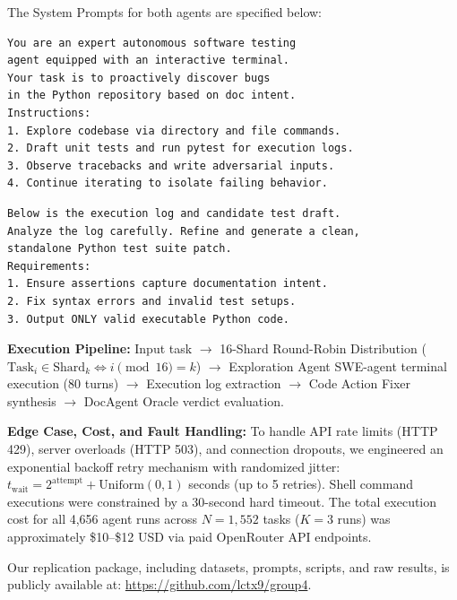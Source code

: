 The System Prompts for both agents are specified below:

\begin{lstlisting}[caption={System Prompt for Exploration Agent}, label={lst:prompt_explore}]
You are an expert autonomous software testing
agent equipped with an interactive terminal.
Your task is to proactively discover bugs
in the Python repository based on doc intent.
Instructions:
1. Explore codebase via directory and file commands.
2. Draft unit tests and run pytest for execution logs.
3. Observe tracebacks and write adversarial inputs.
4. Continue iterating to isolate failing behavior.
\end{lstlisting}

\begin{lstlisting}[caption={System Prompt for Code Action Fixer Agent}, label={lst:prompt_fixer}]
Below is the execution log and candidate test draft.
Analyze the log carefully. Refine and generate a clean,
standalone Python test suite patch.
Requirements:
1. Ensure assertions capture documentation intent.
2. Fix syntax errors and invalid test setups.
3. Output ONLY valid executable Python code.
\end{lstlisting}

\textbf{Execution Pipeline:} Input task $\rightarrow$ 16-Shard Round-Robin Distribution ($\text{Task}_i \in \text{Shard}_k \iff i \pmod{16} = k$) $\rightarrow$ Exploration Agent SWE-agent terminal execution (80 turns) $\rightarrow$ Execution log extraction $\rightarrow$ Code Action Fixer synthesis $\rightarrow$ DocAgent Oracle verdict evaluation.

\textbf{Edge Case, Cost, and Fault Handling:} To handle API rate limits (HTTP 429), server overloads (HTTP 503), and connection dropouts, we engineered an exponential backoff retry mechanism with randomized jitter: $t_{\text{wait}} = 2^{\text{attempt}} + \text{Uniform}(0, 1)$ seconds (up to 5 retries). Shell command executions were constrained by a 30-second hard timeout. The total execution cost for all 4,656 agent runs across $N=1,552$ tasks ($K=3$ runs) was approximately \$10--\$12 USD via paid OpenRouter API endpoints.

Our replication package, including datasets, prompts, scripts, and raw results, is publicly available at: \url{https://github.com/lctx9/group4}.


